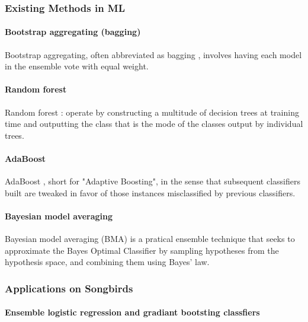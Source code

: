\subsubsection{Existing Methods in ML}

\paragraph{Bootstrap aggregating (bagging)}
Bootstrap aggregating, often abbreviated as bagging \cite{breiman1996bagging}, involves having each model in the ensemble vote with equal weight.

\paragraph{Random forest}

Random forest \cite{breiman2001random}: operate by constructing a multitude of decision trees at training time and outputting the class that is the mode of the classes output by individual trees. 

\paragraph{AdaBoost}

AdaBoost \cite{freund1997decision}, short for "Adaptive Boosting", in the sense that subsequent classifiers built are tweaked in favor of those instances misclassified by previous classifiers. 


\paragraph{Bayesian model averaging}

Bayesian model averaging (BMA) \cite{hoeting1999bayesian}  is a pratical ensemble technique that seeks to approximate the Bayes Optimal Classifier by sampling hypotheses from the hypothesis space, and combining them using Bayes' law.

\subsubsection{Applications on Songbirds}

\paragraph{Ensemble logistic regression and gradiant bootsting classfiers \cite{Massaron13}}

